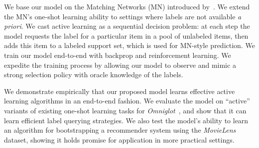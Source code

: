 We base our model on the Matching Networks (MN) introduced by~\citet{vinyals2016matching}.
We extend the MN's one-shot learning ability to settings where labels are not available \emph{a priori}.
We cast active learning as a sequential decision problem: at each step the model requests the label for a particular item in a pool of unlabeled items, then adds this item to a labeled support set, which is used for MN-style prediction.
We train our model end-to-end with backprop and reinforcement learning.
We expedite the training process by allowing our model to observe and mimic a strong selection policy with oracle knowledge of the labels.

We demonstrate empirically that our proposed model learns effective active learning algorithms in an end-to-end fashion.
We evaluate the model on ``active'' variants of existing one-shot learning tasks for \emph{Omniglot}~\citep{lake2015human, vinyals2016matching, santoro2016one}, and show that it can learn efficient label querying strategies.
We also test the model's ability to learn an algorithm for bootstrapping a recommender system using the \emph{MovieLens} dataset, showing it holds promise for application in more practical settings.

